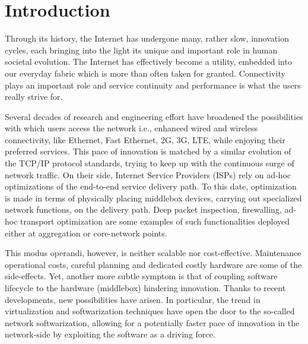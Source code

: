 \chapter{Introduction}
\label{chap:intro}

Through its history, the Internet has undergone many, rather slow, innovation
cycles, each bringing into the light its unique and important role in human
societal evolution. The Internet has effectively become a utility, embedded into
our everyday fabric which is more than often taken for granted. Connectivity
plays an important role and service continuity and performance is what the users
really strive for.

Several decades of research and engineering effort have broadened the
possibilities with which users access the network i.e., enhanced wired and
wireless connectivity, like Ethernet, Fast Ethernet, 2G, 3G, LTE, while enjoying
their preferred services. This pace of innovation is matched by a similar
evolution of the TCP/IP protocol standards, trying to keep up with the
continuous surge of network traffic. On their side, Internet Service Providers
(ISPs) rely on ad-hoc optimizations of the end-to-end service delivery path. To
this date, optimization is made in terms of physically placing middlebox
devices, carrying out specialized network functions, on the delivery path. Deep
packet inspection, firewalling, ad-hoc transport optimization are some examples
of such functionalities deployed either at aggregation or core-network points.

This modus operandi, however, is neither scalable nor cost-effective.
Maintenance operational costs, careful planning and dedicated costly hardware
are some of the side-effects. Yet, another more subtle symptom is that of
coupling software lifecycle to the hardware (middlebox) hindering innovation.
Thanks to recent developments, new possibilities have arisen. In particular, the
trend in virtualization and softwarization techniques have open the door to the
so-called network softwarization, allowing for a potentially faster pace of
innovation in the network-side by exploiting the software as a driving force.

